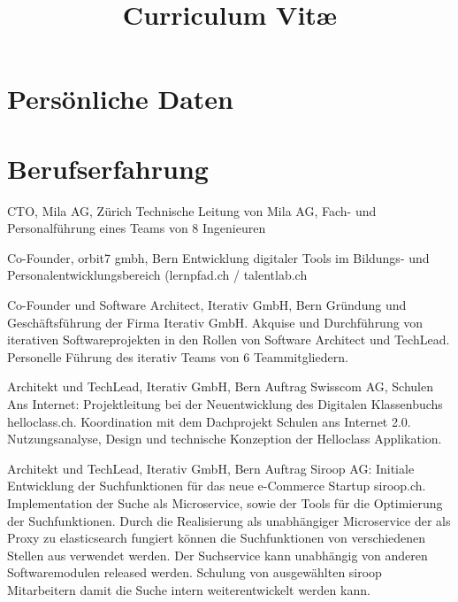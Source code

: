 \documentclass[10pt]{moderncv}
\title{Curriculum Vit\ae{}}
\begin{document}
\maketitle
\makequote

\section{Pers\"onliche Daten}

\section{Berufserfahrung}

{CTO, Mila AG, Z\"urich}
{Technische Leitung von Mila AG, Fach- und Personalf\"uhrung eines Teams von 8 Ingenieuren}

{Co-Founder, orbit7 gmbh, Bern}
{Entwicklung digitaler Tools im Bildungs- und Personalentwicklungsbereich (lernpfad.ch / talentlab.ch}

{Co-Founder und Software Architect, Iterativ GmbH, Bern}
{Gr\"undung und Gesch\"aftsf\"uhrung der Firma Iterativ GmbH. Akquise und Durchf\"uhrung von iterativen Softwareprojekten in den Rollen von Software Architect und TechLead. Personelle F\"uhrung des iterativ Teams von 6 Teammitgliedern.}

\workitem{}
{Architekt und TechLead, Iterativ GmbH, Bern}
{Auftrag Swisscom AG, Schulen Ans Internet:\smallpara 
Projektleitung bei der Neuentwicklung des Digitalen Klassenbuchs helloclass.ch. Koordination mit dem Dachprojekt Schulen ans Internet 2.0. Nutzungsanalyse, Design und technische Konzeption der Helloclass Applikation.}

\workitem{}
{Architekt und TechLead, Iterativ GmbH, Bern}
{Auftrag Siroop AG:\smallpara 
Initiale Entwicklung der Suchfunktionen f\"ur das neue e-Commerce Startup siroop.ch. Implementation der Suche als Microservice, sowie der Tools f\"ur die Optimierung der Suchfunktionen. Durch die Realisierung als unabh\"angiger Microservice der als Proxy zu elasticsearch fungiert k\"onnen die Suchfunktionen von verschiedenen Stellen aus verwendet werden. Der Suchservice kann unabh\"angig von anderen Softwaremodulen released werden.\smallpara 
Schulung von ausgew\"ahlten siroop Mitarbeitern damit die Suche intern weiterentwickelt werden kann.}
\end{document}
